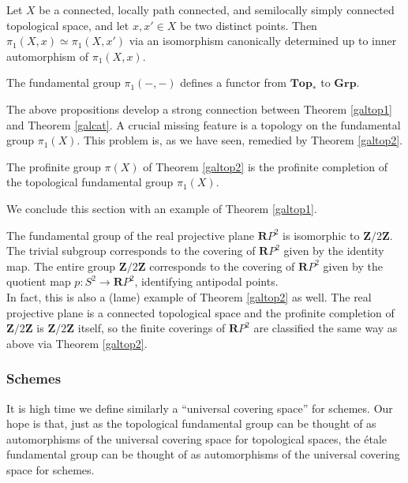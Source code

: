 \documentclass[11pt,openany]{book} %
\newcommand{\R}{\mathbf{R}}
\newcommand{\Z}{\mathbf{Z}}
\begin{document}
\begin{proposition}
Let $X$ be a connected, locally path connected, and semilocally simply connected topological space, and let $x,x' \in X$ be two distinct points. Then $\pi_1(X,x) \simeq \pi_1(X,x')$ via an isomorphism canonically determined up to inner automorphism of $\pi_1(X,x)$.
\end{proposition}
\medskip

\begin{proposition}
The fundamental group $\pi_1(-,-)$ defines a functor from $\mathbf{Top}_*$ to $\mathbf{Grp}$.
\end{proposition}
\medskip

The above propositions develop a strong connection between Theorem \ref{galtop1} and Theorem \ref{galcat}. A crucial missing feature is a topology on the fundamental group $\pi_1(X)$. This problem is, as we have seen, remedied by Theorem \ref{galtop2}.\\

\begin{proposition}
The profinite group $\pi(X)$ of Theorem \ref{galtop2} is the profinite completion of the topological fundamental group $\pi_1(X)$.
\end{proposition}
\medskip

We conclude this section with an example of Theorem \ref{galtop1}.

\begin{example} \label{galtopex}
The fundamental group of the real projective plane $\R P^2$ is isomorphic to $\Z/2\Z$. The trivial subgroup corresponds to the covering of $\R P^2$ given by the identity map. The entire group $\Z/2\Z$ corresponds to the covering of $\R P^2$ given by the quotient map $p : S^2 \to \R P^2$, identifying antipodal points.\\

In fact, this is also a (lame) example of Theorem \ref{galtop2} as well. The real projective plane is a connected topological space and the profinite completion of $\Z/2\Z$ is $\Z/2\Z$ itself, so the finite coverings of $\R P^2$ are classified the same way as above via Theorem \ref{galtop2}.
\end{example}
\pagebreak

\subsubsection{Schemes}
It is high time we define similarly a ``universal covering space'' for schemes. Our hope is that, just as the topological fundamental group can be thought of as automorphisms of the universal covering space for topological spaces, the \'etale fundamental group can be thought of as automorphisms of the universal covering space for schemes.\\
\end{document}
